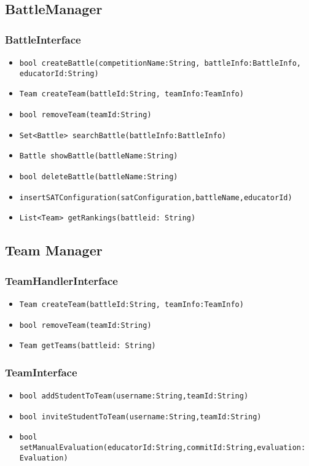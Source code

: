 \subsection{BattleManager}
\subsubsection{BattleInterface}
\begin{itemize}
    \item \texttt{bool createBattle(competitionName:String, battleInfo:BattleInfo, educatorId:String)}
    \item \texttt{Team createTeam(battleId:String, teamInfo:TeamInfo)}
    \item \texttt{bool removeTeam(teamId:String)}
    \item \texttt{Set<Battle> searchBattle(battleInfo:BattleInfo)}
    \item \texttt{Battle showBattle(battleName:String)}
    \item \texttt{bool deleteBattle(battleName:String)}
    \item \texttt{insertSATConfiguration(satConfiguration,battleName,educatorId)}
    \item \texttt{List<Team> getRankings(battleid: String)}
\end{itemize}

\subsection{Team Manager}
\subsubsection{TeamHandlerInterface}
\begin{itemize}
    \item \texttt{Team createTeam(battleId:String, teamInfo:TeamInfo)}
    \item \texttt{bool removeTeam(teamId:String)}
    \item \texttt{Team getTeams(battleid: String)}
\end{itemize}

\subsubsection{TeamInterface}
\begin{itemize}
    \item \texttt{bool addStudentToTeam(username:String,teamId:String)}
    \item \texttt{bool inviteStudentToTeam(username:String,teamId:String)}
    \item \texttt{bool setManualEvaluation(educatorId:String,commitId:String,evaluation: Evaluation)}
\end{itemize}


